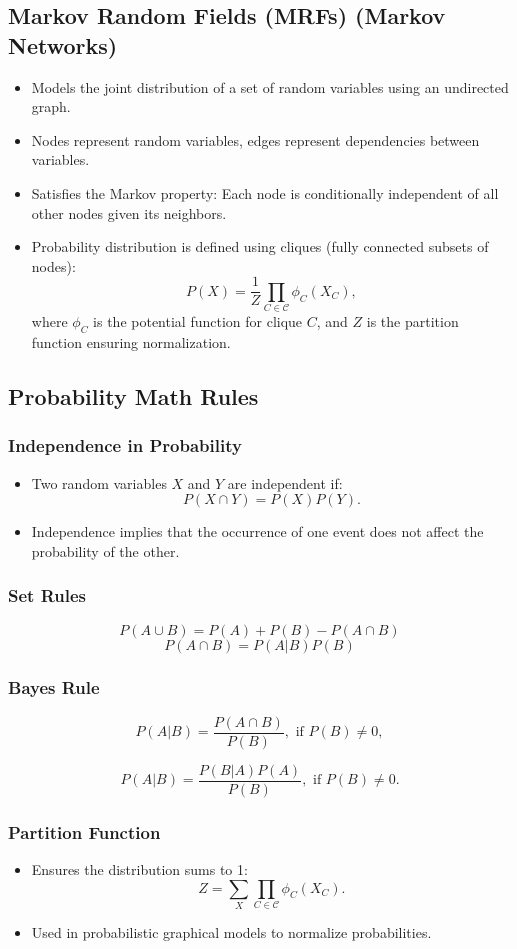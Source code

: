\documentclass[12pt,a4paper]{article}
\begin{document}
\subsection{Markov Random Fields (MRFs) (Markov Networks)}
\begin{itemize}
    \item Models the joint distribution of a set of random variables using an undirected graph.
    \item Nodes represent random variables, edges represent dependencies between variables.
    \item Satisfies the Markov property: Each node is conditionally independent of all other nodes given its neighbors.
    \item Probability distribution is defined using cliques (fully connected subsets of nodes):
    \[ P(X) = \frac{1}{Z} \prod_{C \in \mathcal{C}} \phi_C(X_C), \]
    where $\phi_C$ is the potential function for clique $C$, and $Z$ is the partition function ensuring normalization.
\end{itemize}
\subsection{Probability Math Rules}
\subsubsection{Independence in Probability}
\begin{itemize}
    \item Two random variables $X$ and $Y$ are independent if:
    \[ P(X \cap Y) = P(X)P(Y). \]
    \item Independence implies that the occurrence of one event does not affect the probability of the other.
\end{itemize}
\subsubsection{Set Rules}
\[{\displaystyle P(A \cup B)=P(A)+P(B)-P(A \cap B)}\]
\[{\displaystyle P(A \cap B)=P(A|B)P(B)}\]
\subsubsection{Bayes Rule}
\[{\displaystyle P(A\vert B)={\frac {P(A\cap B)}{P(B)}},{\text{ if }}P(B)\neq 0,}\]

\[{\displaystyle P(A\vert B)={\frac {P(B\vert A)P(A)}{P(B)}},{\text{ if }}P(B)\neq 0.}\]
\subsubsection{Partition Function}
\begin{itemize}
    \item Ensures the distribution sums to 1:
    \[ Z = \sum_X \prod_{C \in \mathcal{C}} \phi_C(X_C). \]
    \item Used in probabilistic graphical models to normalize probabilities.
\end{itemize}
\end{document}
